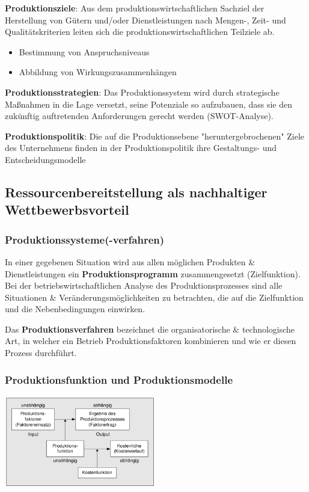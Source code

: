 \documentclass[11pt]{article}
\begin{document}
\begin{enumerate}
\textbf{\textbf{Produktionsziele}}:
Aus dem produktionswirtschaftlichen Sachziel der Herstellung von Gütern und/oder Dienstleistungen nach Mengen-, Zeit- und Qualitätskriterien leiten sich die
produktionswirtschaftlichen Teilziele ab.
\begin{itemize}
\item Bestimmung von Anspruchsniveaus
\item Abbildung von Wirkungszusammenhängen
\end{itemize}

\textbf{\textbf{Produktionsstrategien}}:
Das Produktionssystem wird durch strategische Maßnahmen in die Lage versetzt, seine Potenziale so aufzubauen, dass sie den zukünftig auftretenden Anforderungen gerecht werden (SWOT-Analyse).

\textbf{\textbf{Produktionspolitik}}:
Die auf die Produktionsebene "heruntergebrochenen" Ziele des Unternehmens finden in der Produktionspolitik ihre Gestaltungs- und Entscheidungsmodelle
\end{enumerate}
\subsection{Ressourcenbereitstellung als nachhaltiger Wettbewerbsvorteil}
\label{sec:org24625fb}
\subsubsection{Produktionssysteme(-verfahren)}
\label{sec:org5efcd7a}
In einer gegebenen Situation wird aus allen möglichen Produkten \& Dienstleistungen ein \textbf{Produktionsprogramm} zusammengesetzt (Zielfunktion). Bei der betriebswirtschaftlichen Analyse des Produktionsprozesses sind alle Situationen \& Veränderungsmöglichkeiten zu betrachten, die auf die Zielfunktion und die Nebenbedingungen einwirken.

Das \textbf{Produktionsverfahren} bezeichnet die organisatorische \& technologische Art, in welcher ein Betrieb Produktionsfaktoren kombinieren und wie er diesen Prozess durchführt.

\subsubsection{Produktionsfunktion und Produktionsmodelle}
\label{sec:orgd8fa659}
\begin{center}
\includegraphics[width=250px]{./pictures/prodfunktion.png}
\end{center} 
\end{document}
